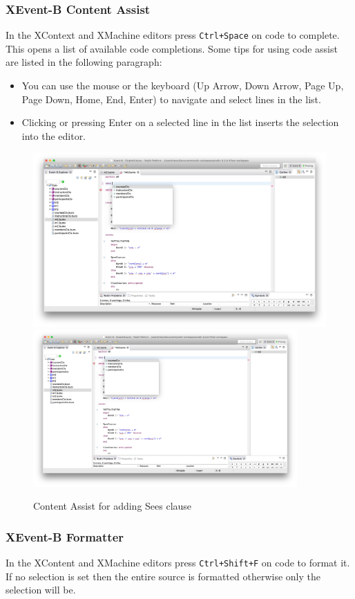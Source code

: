 \subsubsection{XEvent-B Content Assist}
\label{sec:xevent-b-content}
In the XContext and XMachine editors press \texttt{Ctrl+Space} on code to complete. This opens a list of available code completions. Some tips for using code assist are listed in the following paragraph:
\begin{itemize}
\item You can use the mouse or the keyboard (Up Arrow, Down Arrow, Page Up, Page Down, Home, End, Enter) to navigate and select lines in the list.

\item Clicking or pressing Enter on a selected line in the list inserts the selection into the editor.
\end{itemize}
\begin{figure}[!htbp]
  \centering
  \ifplastex
  \includegraphics[width=512]{figures/SeesContentAssist}
  \else
  \includegraphics[width=0.9\textwidth]{figures/SeesContentAssist}
  \fi
  \caption{Content Assist for adding Sees clause}
  \label{fig:SeesContentAssist}
\end{figure}

\subsubsection{XEvent-B Formatter}
\label{sec:xevent-b-formatter}
In the XContent and XMachine editors press \texttt{Ctrl+Shift+F} on code to format it. If no selection is set then the entire source is formatted otherwise only the selection will be. 

